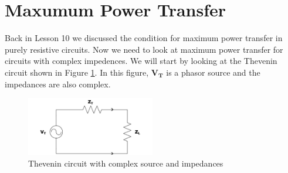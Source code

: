 \documentclass{handout}
\begin{document}


\newpage
\clearpage
\pagebreak

\section{Maxumum Power Transfer}
Back in Lesson 10 we discussed the condition for maximum power transfer in purely resistive circuits.  Now we need to look at maximum power transfer for circuits with complex impedences.  We will start by looking at the Thevenin circuit shown in Figure \ref{fig: Thevenin}.  In this figure, $\mathbf{V_T}$ is a phasor source and the impedances are also complex.
\begin{figure} [h!]
\centering
\includegraphics[width=0.5\textwidth]{Thevenin.jpg}
\caption{Thevenin circuit with complex source and impedances}
\label{fig: Thevenin}
\end{figure}
\end{document}
